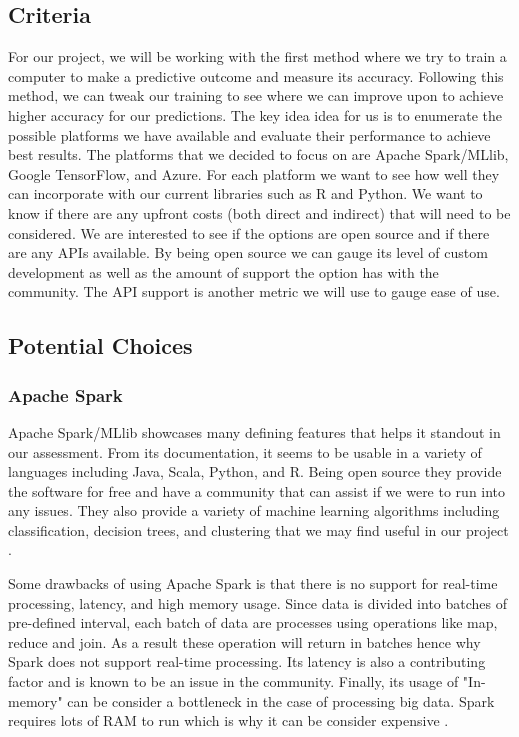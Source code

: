 \documentclass[10pt, onecolumn, draftclsnofoot, letterpaper, compsoc]{IEEEtran}
\begin{document}
\subsection{Criteria}
For our project, we will be working with the first method where we try to train a computer to make a predictive outcome and measure its accuracy.
Following this method, we can tweak our training to see where we can improve upon to achieve higher accuracy for our predictions.
The key idea idea for us is to enumerate the possible platforms we have available and evaluate their performance to achieve best results.
The platforms that we decided to focus on are Apache Spark/MLlib, Google TensorFlow, and Azure.
For each platform we want to see how well they can incorporate with our current libraries such as R and Python. 
We want to know if there are any upfront costs (both direct and indirect) that will need to be considered. 
We are interested to see if the options are open source and if there are any APIs available.
By being open source we can gauge its level of custom development as well as the amount of support the option has with the community.
The API support is another metric we will use to gauge ease of use.

\subsection{Potential Choices}
    \subsubsection{Apache Spark}
    Apache Spark/MLlib showcases many defining features that helps it standout in our assessment.
    From its documentation, it seems to be usable in a variety of languages including Java, Scala, Python, and R.
    Being open source they provide the software for free and have a community that can assist if we were to run into any issues.
    They also provide a variety of machine learning algorithms including classification, decision trees, and clustering that we may find useful in our project \cite{apachesparkMlib}.\par
    Some drawbacks of using Apache Spark is that there is no support for real-time processing, latency, and high memory usage.
    Since data is divided into batches of pre-defined interval, each batch of data are processes using operations like map, reduce and join. As a result these operation will return in batches hence why Spark does not support real-time processing.
    Its latency is also a contributing factor and is known to be an issue in the community.
    Finally, its usage of "In-memory" can be consider a bottleneck in the case of processing big data.
    Spark requires lots of RAM to run which is why it can be consider expensive \cite{negapachespark}.
    
\end{document}
